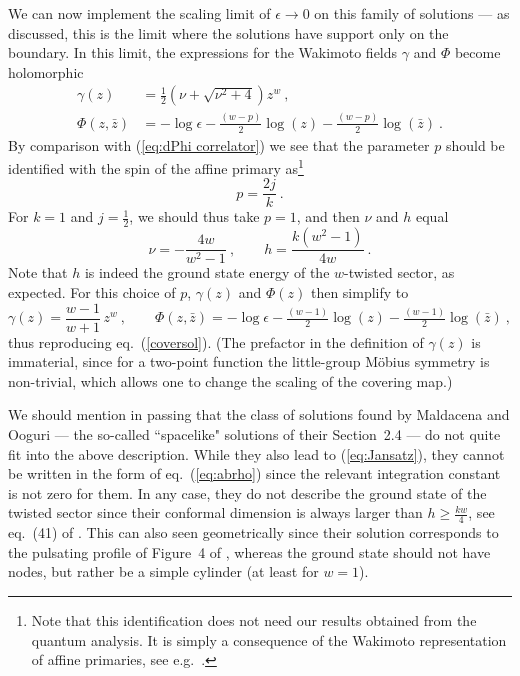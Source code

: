 \documentclass[12pt,a4paper]{article}
\newcommand{\be}{\begin{equation}}
\newcommand{\ee}{\end{equation}}
\begin{document}
We can now implement the scaling limit of $\epsilon\rightarrow 0$ on this family of solutions --- as discussed, this is the limit where the solutions have support only on the boundary. In this limit, the
expressions for the Wakimoto fields $\gamma$ and $\Phi$ become holomorphic 
\begin{subequations}\label{Phisol}
\begin{align}
\gamma(z)&=\frac{1}{2}\left(\nu+\sqrt{\nu^2+4}\right)z^w\ , \\
\Phi(z,\bar{z})&= -\log\epsilon - \tfrac{(w-p)}{2}\log(z) - \tfrac{(w-p)}{2} \log(\bar{z})\ . 
\end{align}
\end{subequations}
By comparison with (\ref{eq:dPhi correlator}) we see that the parameter $p$ should be identified with the spin of the affine primary as\footnote{Note that this identification does not need our results obtained from the quantum analysis. It is simply a consequence of the Wakimoto representation of affine primaries, see e.g.~\cite[eq.~(2.12)]{Eberhardt:2019qcl}.} 
\be
p = \frac{2j}{k} \ . 
\ee
For $k=1$ and $j=\frac{1}{2}$, we should thus take $p=1$, and then $\nu$ and $h$ equal
\be
\nu = - \frac{4w}{w^2-1} \ , \qquad h = \frac{k (w^2-1)}{4w} \ . 
\ee
Note that $h$ is indeed the ground state energy of the $w$-twisted sector, as expected. For this choice of $p$, $\gamma(z)$ and $\Phi(z)$ then simplify to
\be\label{eq:finalsol}
\gamma(z) = \frac{w-1}{w+1} \, z^w  \ , \qquad 
\Phi(z,\bar{z})= -\log\epsilon - \tfrac{(w-1)}{2}\log(z) - \tfrac{(w-1)}{2} \log(\bar{z}) \ ,  
\ee
thus reproducing eq.~(\ref{coversol}). (The prefactor in the definition of $\gamma(z)$ is immaterial, since for a two-point function the little-group M\"obius symmetry is non-trivial, which allows one to change the scaling of the covering map.)

We should mention in passing that the class of solutions found by Maldacena and Ooguri \cite{Maldacena:2000hw} --- the so-called ``spacelike" solutions of their Section~2.4  --- do not quite fit into the above description. While they also lead to (\ref{eq:Jansatz}), they cannot be written in the form of eq.~(\ref{eq:abrho}) since the relevant integration constant is not zero for them. In any case, they do not describe the ground state of the twisted sector since their conformal dimension is always larger than $h\geq \frac{kw}{4}$, see eq.~(41) of \cite{Maldacena:2000hw}. This can also seen geometrically since their solution corresponds to the pulsating profile of Figure~4 of \cite{Maldacena:2000hw}, whereas the ground state should not have nodes, but rather be a simple cylinder (at least for $w=1$). 
\end{document}
